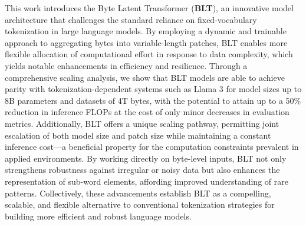 This work introduces the Byte Latent Transformer (\textbf{BLT}), an innovative model architecture that challenges the standard reliance on fixed-vocabulary tokenization in large language models. By employing a dynamic and trainable approach to aggregating bytes into variable-length patches, {\textsc BLT} enables more flexible allocation of computational effort in response to data complexity, which yields notable enhancements in efficiency and resilience. Through a comprehensive scaling analysis, we show that {\textsc BLT} models are able to achieve parity with tokenization-dependent systems such as Llama 3 for model sizes up to 8B parameters and datasets of 4T bytes, with the potential to attain up to a 50\% reduction in inference FLOPs at the cost of only minor decreases in evaluation metrics. Additionally, {\textsc BLT} offers a unique scaling pathway, permitting joint escalation of both model size and patch size while maintaining a constant inference cost—a beneficial property for the computation constraints prevalent in applied environments. By working directly on byte-level inputs, {\textsc BLT} not only strengthens robustness against irregular or noisy data but also enhances the representation of sub-word elements, affording improved understanding of rare patterns. Collectively, these advancements establish {\textsc BLT} as a compelling, scalable, and flexible alternative to conventional tokenization strategies for building more efficient and robust language models.

